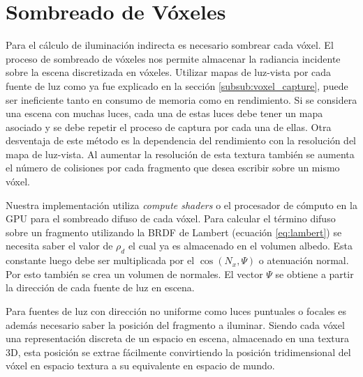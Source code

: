 \section{Sombreado de Vóxeles} %
\label{sec:sombreado_de_voxeles}
Para el cálculo de iluminación indirecta es necesario sombrear cada vóxel. El proceso de sombreado de vóxeles nos permite almacenar la radiancia incidente sobre la escena discretizada en vóxeles. Utilizar mapas de luz-vista por cada fuente de luz como ya fue explicado en la sección \ref{subsub:voxel_capture}, puede ser ineficiente tanto en consumo de memoria como en rendimiento. Si se considera una escena con muchas luces, cada una de estas luces debe tener un mapa asociado y se debe repetir el proceso de captura por cada una de ellas. Otra desventaja de este método es la dependencia del rendimiento con la resolución del mapa de luz-vista. Al aumentar la resolución de esta textura también se aumenta el número de colisiones por cada fragmento que desea escribir sobre un mismo vóxel.

Nuestra implementación utiliza \emph{compute shaders} o el procesador de cómputo en la \ac{GPU} para el sombreado difuso de cada vóxel. Para calcular el término difuso sobre un fragmento utilizando la \ac{BRDF} de Lambert (ecuación \ref{eq:lambert}) se necesita saber el valor de $\rho_{d}$ el cual ya es almacenado en el volumen albedo. Esta constante luego debe ser multiplicada por el $\cos(N_{x}, \Psi)$ o atenuación normal. Por esto también se crea un volumen de normales. El vector $\Psi$ se obtiene a partir la dirección de cada fuente de luz en escena.

Para fuentes de luz con dirección no uniforme como luces puntuales o focales es además necesario saber la posición del fragmento a iluminar. Siendo cada vóxel una representación discreta de un espacio en escena, almacenado en una textura 3D, esta posición se extrae fácilmente convirtiendo la posición tridimensional del vóxel en espacio textura a su equivalente en espacio de mundo.

